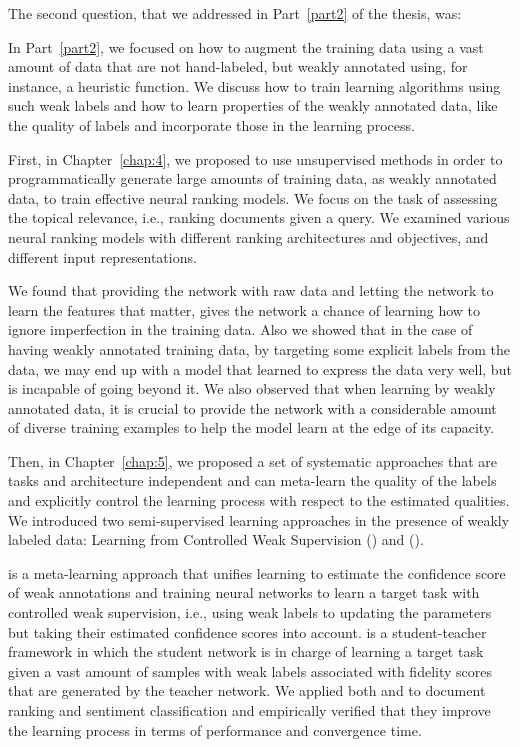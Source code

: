\bigskip
The second question, that we addressed in Part~\ref{part2} of the thesis, was:
%

In Part~\ref{part2}, we focused on how to augment the training data using a vast amount of data that are not hand-labeled, but weakly annotated using, for instance, a heuristic function. We discuss how to train learning algorithms using such weak labels and how to learn properties of the weakly annotated data, like the quality of labels and incorporate those in the learning process.  

First, in Chapter~\ref{chap:4}, we proposed to use unsupervised methods in order to programmatically generate large amounts of training data, as weakly annotated data, to train effective neural ranking models. We focus on the task of assessing the topical relevance, i.e., ranking documents given a query. We examined various neural ranking models with different ranking architectures and objectives, and different input representations.

We found that providing the network with raw data and letting the network to learn the features that matter, gives the network a chance of learning how to ignore imperfection in the training data. Also we showed that in the case of having weakly annotated training data, by targeting some explicit labels from the data, we may end up with a model that learned to express the data very well, but is incapable of going beyond it. We also observed that when learning by weakly annotated data, it is crucial to provide the network with a considerable amount of diverse training examples to help the model learn at the edge of its capacity.

Then, in Chapter~\ref{chap:5}, we proposed a set of systematic approaches that are tasks and architecture independent and can meta-learn the quality of the labels and explicitly control the learning process with respect to the estimated qualities. We introduced two semi-supervised learning approaches in the presence of weakly labeled data: Learning from Controlled Weak Supervision (\cws) and \fwlfulllc (\fwl).

\cws is a meta-learning approach that unifies learning to estimate the confidence score of weak annotations and training neural networks to learn a target task with controlled weak supervision, i.e., using weak labels to updating the parameters but taking their estimated confidence scores into account. \fwl is a student-teacher framework in which the student network is in charge of learning a target task given a vast amount of samples with weak labels associated with fidelity scores that are generated by the teacher network.  We applied both \cws and \fwl to document ranking and sentiment classification and empirically verified that they improve the learning process in terms of performance and convergence time. 

